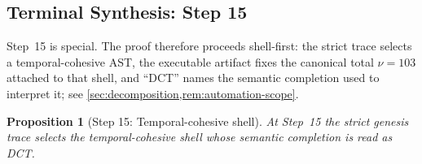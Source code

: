 \documentclass[11pt,a4paper]{article}
\theoremstyle{plain}
\newtheorem{proposition}[theorem]{Proposition}
\theoremstyle{definition}
\theoremstyle{remark}
\begin{document}
\subsection{Terminal Synthesis: Step 15}
\label{subsec:genesis-terminal-proof}

Step~15 is special.
The proof therefore proceeds shell-first: the strict trace selects a
temporal-cohesive AST, the executable artifact fixes the canonical total
$\nu=103$ attached to that shell, and ``DCT'' names the semantic completion
used to interpret it; see \cref{sec:decomposition,rem:automation-scope}.

\begin{proposition}[Step 15: Temporal-cohesive shell]
\label{prop:genesis-step15}
At Step~15 the strict genesis trace selects the temporal-cohesive shell whose
semantic completion is read as DCT.
\end{proposition}
\end{document}
